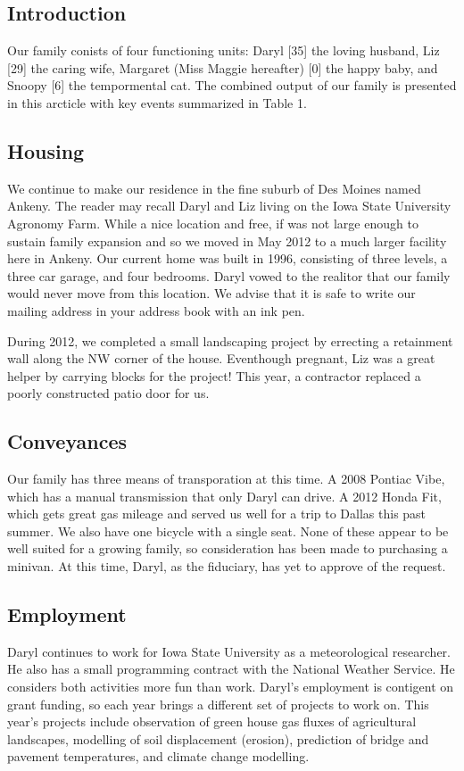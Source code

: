 \documentclass{article}
\begin{document}
\begin{multicols}{2}

\section{Introduction}
Our family conists of four functioning units:  Daryl [35] the loving
husband, Liz [29] the caring wife, Margaret (Miss Maggie hereafter) [0] 
the happy baby, and Snoopy [6] the tempormental cat.  The combined output
of our family is presented in this arcticle with key events summarized in
Table 1.

\subsection{Housing}

We continue to make our residence in the fine suburb of Des Moines 
named Ankeny.  The reader may recall Daryl and Liz living on the
Iowa State University Agronomy Farm.  While a nice location and free,
if was not large enough to sustain family expansion and so we moved 
in May 2012 to a much larger facility here in Ankeny.  Our current home 
was built in 1996, consisting of three levels, a three car garage, and
four bedrooms.  Daryl vowed to the realitor that our family would never
move from this location.  We advise that it is safe to write our mailing
address in your address book with an ink pen.

During 2012, we completed a small landscaping project by errecting a 
retainment wall along the NW corner of the house.  Eventhough pregnant,
Liz was a great helper by carrying blocks for the project!  This year, 
a contractor replaced a poorly constructed patio door for us.

\subsection{Conveyances}

Our family has three means of transporation at this time.  A 2008 Pontiac 
Vibe, which has a manual transmission that only Daryl can drive.  A 2012 
Honda Fit, which gets great gas mileage and served us well for a trip to
Dallas this past summer.  We also have one bicycle with a single seat.
None of these appear to be well suited for a growing family, so consideration
has been made to purchasing a minivan.  At this time, Daryl, as the fiduciary,
has yet to approve of the request.

\subsection{Employment}
Daryl continues to work for Iowa State University as a meteorological 
researcher.  He also has a small programming contract with the National
Weather Service.  He considers both activities more fun than work.  Daryl's
employment is contigent on grant funding, so each year brings a different
set of projects to work on.  This year's projects include observation of
green house gas fluxes of agricultural landscapes, modelling of soil
displacement (erosion), prediction of bridge and pavement temperatures, and
climate change modelling.


\end{multicols}
\end{document}
